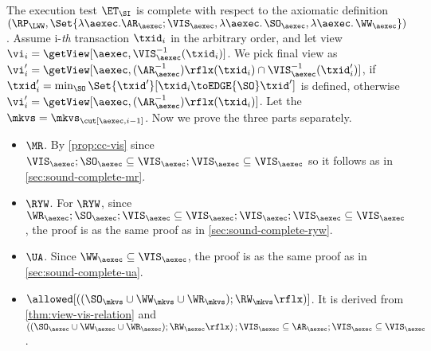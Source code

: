The execution test $\ET_\SI$ is complete with respect to the axiomatic definition 
\( (\RP_{\LWW}, \Set{\lambda \aexec.  \AR_\aexec ; \VIS_{\aexec}, \lambda \aexec \ldotp \SO_\aexec , \lambda \aexec \ldotp \WW_\aexec })\).
Assume i-\emph{th} transaction \( \txid_i \) in the arbitrary order,
and let view \( \vi_{i} = \getView[\aexec, \VIS^{-1}_{\aexec}(\txid_{i})] \).
We pick final view as \( \vi'_{i} = \getView[\aexec, (\AR^{-1}_{\aexec})\rflx(\txid_{i}) \cap \VIS_{\aexec}^{-1}(\txid'_i)] \),
if \( \txid'_i = \min_{\SO}\Set{\txid'}[\txid_i \toEDGE{\SO} \txid' ]\) is defined,
otherwise  \( \vi'_{i} = \getView[\aexec, (\AR^{-1}_{\aexec})\rflx(\txid_{i})]\).
Let the \( \mkvs = \mkvs_{\cut[\aexec, i-1]} \).
Now we prove the three parts separately.
\begin{itemize}
    \item \( \MR \).  By \cref{prop:cc-vis} since 
    \( \VIS_\aexec ; \SO_\aexec \subseteq \VIS_\aexec ; \VIS_\aexec \subseteq \VIS_\aexec \)
    so it follows as in \cref{sec:sound-complete-mr}.
    \item \( \RYW \). For \( \RYW \), since \( \WR_\aexec ; \SO_\aexec ; \VIS_\aexec \subseteq \VIS_\aexec ; \VIS_\aexec ; \VIS_\aexec \subseteq \VIS_\aexec\), 
    the proof is as the same proof as in \cref{sec:sound-complete-ryw}.
    \item \( \UA \). Since \( \WW_\aexec \subseteq \VIS_\aexec\), 
    the proof is as the same proof as in \cref{sec:sound-complete-ua}.
    \item \( \allowed[\left( (\SO_{\mkvs} \cup \WW_{\mkvs} \cup \WR_{\mkvs} ) ; \RW_{\mkvs}\rflx \right)]\). It is derived from \cref{thm:view-vis-relation} and 
        \( \left( (\SO_{\aexec} \cup \WW_{\aexec} \cup \WR_{\aexec} ) ; \RW_{\aexec}\rflx \right) ; \VIS_\aexec \subseteq \AR_\aexec ; \VIS_\aexec \subseteq \VIS_\aexec\).
\end{itemize}
